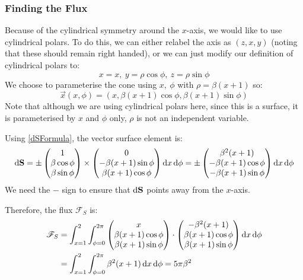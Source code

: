 \documentclass[../main.tex]{subfiles}
\begin{document}
\subsubsection{Finding the Flux}
Because of the cylindrical symmetry around the $x$-axis, we would like to use cylindrical polars.
To do this, we can either relabel the axis as $(z, x, y)$ (noting that these should remain right handed), or we can just modify our definition of cylindrical polars to:
\[
  x = x,\ y = \rho \cos \phi,\ z = \rho \sin \phi
\]
We choose to parameterise the cone using $x,\ \phi$ with $\rho = \beta(x + 1)$ so:
\[
  \vec{x}(x, \phi) = (x, \beta(x + 1)\cos \phi, \beta(x + 1)\sin \phi)
\]
Note that although we are using cylindrical polars here, since this is a surface, it is parameterised by $x$ and $\phi$ only, $\rho$ is not an independent variable.

Using \cref{dSFormula}, the vector surface element is:
\[
  \d{\vec{S}} = \pm \begin{pmatrix}
  1 \\
  \beta \cos \phi \\
  \beta \sin \phi \\
  \end{pmatrix} \times \begin{pmatrix}
  0 \\
  -\beta(x + 1)\sin \phi \\
  \beta(x + 1) \cos \phi \\
  \end{pmatrix} \d{x}\d{\phi} = \pm \begin{pmatrix}
  \beta^2(x + 1) \\
  -\beta(x + 1)\cos \phi \\
  -\beta(x + 1)\sin \phi \\
  \end{pmatrix} \d{x}\d{\phi}
\]
We need the $-$ sign to ensure that $\d{\vec{S}}$ points away from the $x$-axis.

Therefore, the flux $\mathscr{F}_S$ is:
\begin{align*}
  \mathscr{F}_S &= \int_{x = 1}^{2} \int_{\phi = 0}^{2\pi} \begin{pmatrix}
  x \\
  \beta(x + 1)\cos \phi \\
  \beta(x + 1)\sin \phi \\
  \end{pmatrix} \cdot \begin{pmatrix}
  -\beta^2 (x + 1) \\
  \beta(x + 1)\cos \phi \\
  \beta(x + 1)\sin \phi \\
  \end{pmatrix} \d{x} \d{\phi} \\
                &= \int_{x = 1}^{2} \int_{\phi = 0}^{2\pi} \beta^2(x + 1) \d{x} \d{\phi} = 5 \pi \beta^2
\end{align*}
\end{document}
